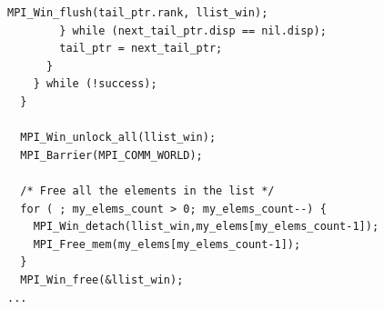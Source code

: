 \begin{example}
\begin{lstlisting}[language={[MPI]C},basicstyle=\lstsmall]
          MPI_Win_flush(tail_ptr.rank, llist_win);
        } while (next_tail_ptr.disp == nil.disp);
        tail_ptr = next_tail_ptr;
      }
    } while (!success);
  }

  MPI_Win_unlock_all(llist_win);
  MPI_Barrier(MPI_COMM_WORLD);

  /* Free all the elements in the list */
  for ( ; my_elems_count > 0; my_elems_count--) {
    MPI_Win_detach(llist_win,my_elems[my_elems_count-1]);
    MPI_Free_mem(my_elems[my_elems_count-1]);
  }
  MPI_Win_free(&llist_win);
...
\end{lstlisting}
\end{example}


